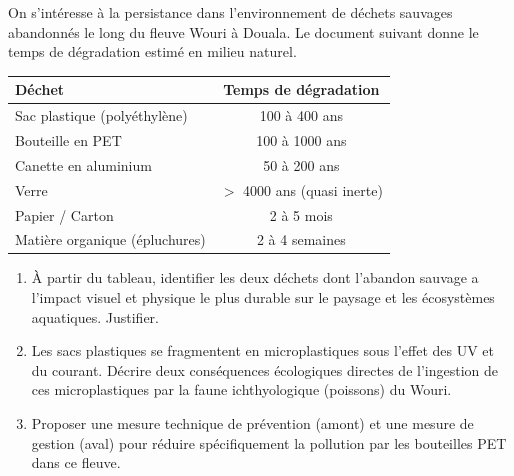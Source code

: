 \documentclass[11pt]{article}
\begin{document}
\begin{exercice}
On s'intéresse à la persistance dans l'environnement de déchets sauvages abandonnés le long du fleuve Wouri à Douala. Le document suivant donne le temps de dégradation estimé en milieu naturel.

\begin{tabular}{|l|c|}
\hline
\textbf{Déchet} & \textbf{Temps de dégradation} \\
\hline
Sac plastique (polyéthylène) & 100 à 400 ans \\
\hline
Bouteille en PET & 100 à 1000 ans \\
\hline
Canette en aluminium & 50 à 200 ans \\
\hline
Verre & $>$ 4000 ans (quasi inerte) \\
\hline
Papier / Carton & 2 à 5 mois \\
\hline
Matière organique (épluchures) & 2 à 4 semaines \\
\hline
\end{tabular}

\begin{enumerate}
    \item À partir du tableau, identifier les deux déchets dont l'abandon sauvage a l'impact visuel et physique le plus durable sur le paysage et les écosystèmes aquatiques. Justifier.
    \item Les sacs plastiques se fragmentent en microplastiques sous l'effet des UV et du courant. Décrire deux conséquences écologiques directes de l'ingestion de ces microplastiques par la faune ichthyologique (poissons) du Wouri.
    \item Proposer une mesure technique de prévention (amont) et une mesure de gestion (aval) pour réduire spécifiquement la pollution par les bouteilles PET dans ce fleuve.
\end{enumerate}
\end{exercice}
\end{document}
